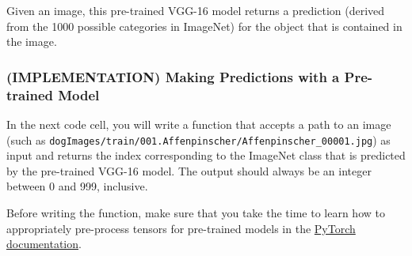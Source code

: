 \documentclass[11pt]{article}
\begin{document}
    Given an image, this pre-trained VGG-16 model returns a prediction
(derived from the 1000 possible categories in ImageNet) for the object
that is contained in the image.

    \hypertarget{implementation-making-predictions-with-a-pre-trained-model}{%
\subsubsection{(IMPLEMENTATION) Making Predictions with a Pre-trained
Model}\label{implementation-making-predictions-with-a-pre-trained-model}}

In the next code cell, you will write a function that accepts a path to
an image (such as
\texttt{\textquotesingle{}dogImages/train/001.Affenpinscher/Affenpinscher\_00001.jpg\textquotesingle{}})
as input and returns the index corresponding to the ImageNet class that
is predicted by the pre-trained VGG-16 model. The output should always
be an integer between 0 and 999, inclusive.

Before writing the function, make sure that you take the time to learn
how to appropriately pre-process tensors for pre-trained models in the
\href{http://pytorch.org/docs/stable/torchvision/models.html}{PyTorch
documentation}.
\end{document}
